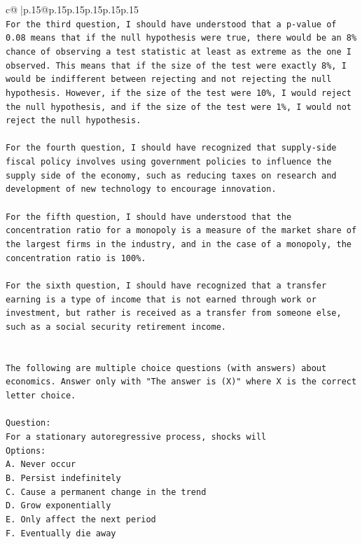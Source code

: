 \documentclass{article}
\begin{document}
{\begin{supertabular}{c@{$\;$}|p{.15\linewidth}@{}p{.15\linewidth}p{.15\linewidth}p{.15\linewidth}p{.15\linewidth}p{.15\linewidth}}
{{{\\ 
\texttt{For the third question, I should have understood that a p{-}value of 0.08 means that if the null hypothesis were true, there would be an 8\% chance of observing a test statistic at least as extreme as the one I observed. This means that if the size of the test were exactly 8\%, I would be indifferent between rejecting and not rejecting the null hypothesis. However, if the size of the test were 10\%, I would reject the null hypothesis, and if the size of the test were 1\%, I would not reject the null hypothesis.} \\
\\ 
\texttt{For the fourth question, I should have recognized that supply{-}side fiscal policy involves using government policies to influence the supply side of the economy, such as reducing taxes on research and development of new technology to encourage innovation.} \\
\\ 
\texttt{For the fifth question, I should have understood that the concentration ratio for a monopoly is a measure of the market share of the largest firms in the industry, and in the case of a monopoly, the concentration ratio is 100\%.} \\
\\ 
\texttt{For the sixth question, I should have recognized that a transfer earning is a type of income that is not earned through work or investment, but rather is received as a transfer from someone else, such as a social security retirement income.} \\
\\ 
\\ 
\texttt{The following are multiple choice questions (with answers) about economics. Answer only with "The answer is (X)" where X is the correct letter choice.} \\
\\ 
\texttt{Question:} \\
\texttt{For a stationary autoregressive process, shocks will} \\
\texttt{Options:} \\
\texttt{A. Never occur} \\
\texttt{B. Persist indefinitely} \\
\texttt{C. Cause a permanent change in the trend} \\
\texttt{D. Grow exponentially} \\
\texttt{E. Only affect the next period} \\
\texttt{F. Eventually die away} \\
}}}
\end{supertabular}}
\end{document}
